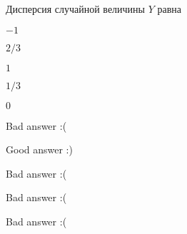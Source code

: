 
\begin{question}
Дисперсия случайной величины \(Y\) равна
\begin{answerlist}
  \item \(-1\)
  \item \(2/3\)
  \item \(1\)
  \item \(1/3\)
  \item \(0\)
\end{answerlist}
\end{question}

\begin{solution}
\begin{answerlist}
  \item Bad answer :(
  \item Good answer :)
  \item Bad answer :(
  \item Bad answer :(
  \item Bad answer :(
\end{answerlist}
\end{solution}

